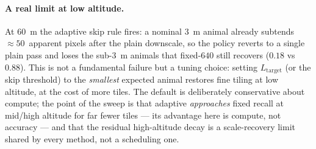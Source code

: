 \documentclass[11pt,a4paper]{article}
\begin{document}
\paragraph{A real limit at low altitude.}
At $60$~m the adaptive skip rule fires: a nominal $3$~m animal already subtends
$\approx\!50$~apparent pixels after the plain downscale, so the policy reverts to
a single plain pass and loses the sub-$3$~m animals that fixed-$640$ still
recovers ($0.18$ vs $0.88$). This is not a fundamental failure but a tuning
choice: setting $L_{\mathrm{target}}$ (or the skip threshold) to the
\emph{smallest} expected animal restores fine tiling at low altitude, at the cost
of more tiles. The default is deliberately conservative about compute; the point
of the sweep is that adaptive \emph{approaches} fixed recall at mid/high altitude
for far fewer tiles --- its advantage here is compute, not accuracy --- and that
the residual high-altitude decay is a scale-recovery limit shared by every
method, not a scheduling one.
\end{document}
